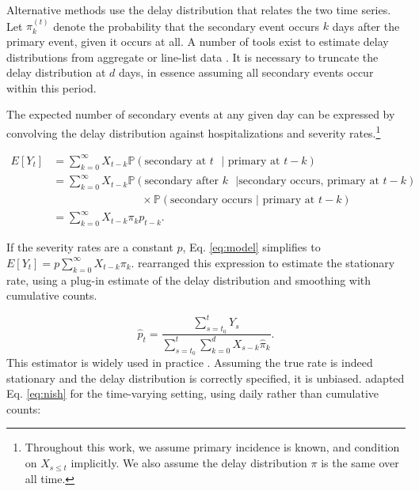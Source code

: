 \documentclass{article}
\begin{document}
Alternative methods use the delay distribution that relates the two time series. Let $\pi_k^{(t)}$ denote the probability that the secondary event occurs $k$ days after the primary event, given it occurs at all. A number of tools exist to estimate delay distributions from aggregate or line-list data \cite{delay_distrs}. It is necessary to truncate the delay distribution at $d$ days, in essence assuming all secondary events occur within this period. 

The expected number of secondary events at any given day can be expressed by convolving the delay distribution against hospitalizations and severity rates.\footnote{Throughout this work, we assume primary incidence is known, and condition on $X_{s\leq t}$ implicitly. We also assume the delay distribution $\pi$ is the same over all time.}

\begin{align}\label{eq:model}
    E[Y_t] &= \sum_{k=0}^\infty X_{t-k} \mathbb{P}(\text{secondary at $t$ }\vert\text{ primary at }t-k) \nonumber \\
            &= \sum_{k=0}^\infty X_{t-k} \mathbb{P}(\text{secondary after $k$ }\vert\text{secondary occurs, primary at }t-k) \nonumber \\
    &\qquad\qquad\qquad\qquad\times\mathbb{P}(\text{secondary occurs }\vert\text{ primary at $t-k$}) \nonumber \\
    &= \sum_{k=0}^\infty X_{t-k} \pi_k p_{t-k}.%
\end{align}

\noindent If the severity rates are a constant $p$, Eq. \ref{eq:model} simplifies to $E[Y_t] = p\sum_{k=0}^\infty X_{t-k}\pi_k$. \citeauthor{nishiura} rearranged this expression to estimate the stationary rate, using a plug-in estimate of the delay distribution and smoothing with cumulative counts.

\begin{equation}\label{eq:nish}
    \hat{p}_t = \frac{\sum_{s=t_0}^t Y_s}{\sum_{s=t_0}^t \sum_{k=0}^d X_{s-k}\hat\pi_k}.
\end{equation}
This estimator is widely used in practice \cite{nishiuraEx1, nishiuraEx2, Russell2020}. Assuming the true rate is indeed stationary and the delay distribution is correctly specified, it is unbiased. \citeauthor{UKpaper} adapted Eq. \ref{eq:nish} for the time-varying setting, using daily rather than cumulative counts:
\end{document}
